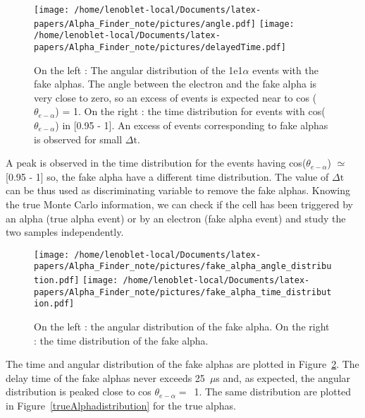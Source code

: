 \documentclass[main.tex]{subfiles}
\begin{document}
\begin{figure}[h!]
\begin{center}
\texttt{[image: /home/lenoblet-local/Documents/latex-papers/Alpha\_Finder\_note/pictures/angle.pdf]}
\texttt{[image: /home/lenoblet-local/Documents/latex-papers/Alpha\_Finder\_note/pictures/delayedTime.pdf]}
\caption{On the left : The angular distribution of the 1e1$\alpha$ events with the fake alphas. The angle between the electron and the fake alpha is very close to zero, so an excess of events is expected near to  cos ($\theta_{e-\alpha}$) = 1. On the right : the time distribution for events with cos($\theta_{e-\alpha}$) in [0.95 - 1]. An excess of events corresponding to fake alphas is observed for small $\Delta \text{t}$.} 
\label{angularDistribution}
\end{center}
\end{figure}

\bigskip

\noindent A peak is observed in the time distribution for the events having cos($\theta_{e-\alpha}$) $\simeq$ [0.95 - 1] so, the fake alpha have a different time distribution. The value of $\Delta \text{t}$ can be thus used as discriminating variable to remove the fake alphas. Knowing the true Monte Carlo information, we can check if the cell has been triggered by an alpha (true alpha event) or by an electron (fake alpha event) and study the two samples independently.


\begin{figure}[h!]
\begin{center}
\texttt{[image: /home/lenoblet-local/Documents/latex-papers/Alpha\_Finder\_note/pictures/fake\_alpha\_angle\_distribution.pdf]}
\texttt{[image: /home/lenoblet-local/Documents/latex-papers/Alpha\_Finder\_note/pictures/fake\_alpha\_time\_distribution.pdf]}
\caption{On the left : the angular distribution of the fake alpha. On the right : the time distribution of the fake alpha.}
\label{fakeAlphadistribution}
\end{center}
\end{figure}


\noindent The time and angular distribution of the fake alphas are plotted in Figure~\ref{fakeAlphadistribution}. The delay time of the fake alphas never exceeds 25~$\mu$s and, as expected, the angular distribution is peaked close to cos $\theta_{e-\alpha} =$~1. The same distribution are plotted in Figure~\ref{trueAlphadistribution} for the true alphas.
\end{document}
